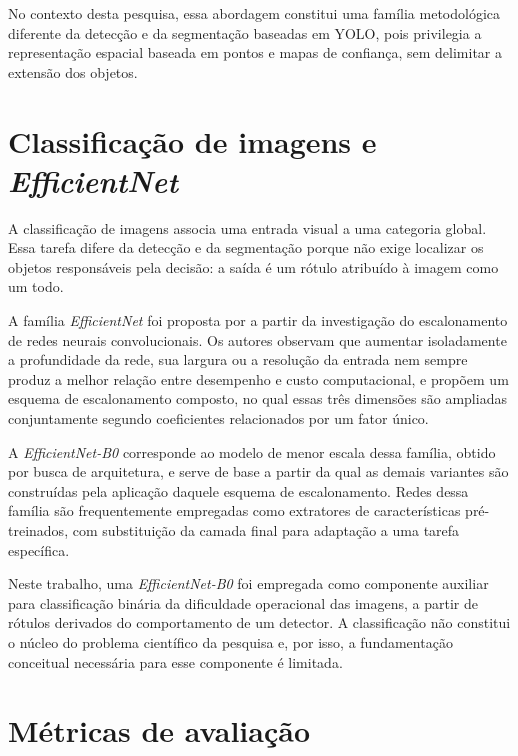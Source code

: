 No contexto desta pesquisa, essa abordagem constitui uma fam\'ilia metodol\'ogica diferente da detec\c{c}\~ao e da segmenta\c{c}\~ao baseadas em YOLO, pois privilegia a representa\c{c}\~ao espacial baseada em pontos e mapas de confian\c{c}a, sem delimitar a extens\~ao dos objetos.

\section{Classifica\c{c}\~ao de imagens e \textit{EfficientNet}}
\label{sec:classificacao-efficientnet}

A classifica\c{c}\~ao de imagens associa uma entrada visual a uma categoria global. Essa tarefa difere da detec\c{c}\~ao e da segmenta\c{c}\~ao porque n\~ao exige localizar os objetos respons\'aveis pela decis\~ao: a sa\'ida \'e um r\'otulo atribu\'ido \`a imagem como um todo.

A fam\'ilia \textit{EfficientNet} foi proposta por \citet{tan2019} a partir da investiga\c{c}\~ao do escalonamento de redes neurais convolucionais. Os autores observam que aumentar isoladamente a profundidade da rede, sua largura ou a resolu\c{c}\~ao da entrada nem sempre produz a melhor rela\c{c}\~ao entre desempenho e custo computacional, e prop\~oem um esquema de escalonamento composto, no qual essas tr\^es dimens\~oes s\~ao ampliadas conjuntamente segundo coeficientes relacionados por um fator \'unico.

A \textit{EfficientNet-B0} corresponde ao modelo de menor escala dessa fam\'ilia, obtido por busca de arquitetura, e serve de base a partir da qual as demais variantes s\~ao constru\'idas pela aplica\c{c}\~ao daquele esquema de escalonamento. Redes dessa fam\'ilia s\~ao frequentemente empregadas como extratores de caracter\'isticas pr\'e-treinados, com substitui\c{c}\~ao da camada final para adapta\c{c}\~ao a uma tarefa espec\'ifica.

Neste trabalho, uma \textit{EfficientNet-B0} foi empregada como componente auxiliar para classifica\c{c}\~ao bin\'aria da dificuldade operacional das imagens, a partir de r\'otulos derivados do comportamento de um detector. A classifica\c{c}\~ao n\~ao constitui o n\'ucleo do problema cient\'ifico da pesquisa e, por isso, a fundamenta\c{c}\~ao conceitual necess\'aria para esse componente \'e limitada.

\section{M\'etricas de avalia\c{c}\~ao}
\label{sec:metricas-avaliacao}


